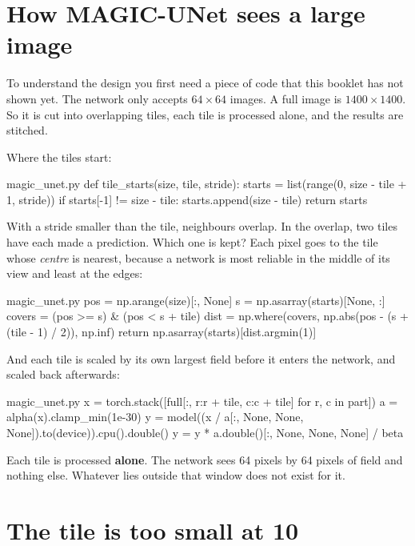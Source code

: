 \section{How MAGIC-UNet sees a large image}

To understand the design you first need a piece of code that this booklet has not shown yet. The network only accepts
$64\times64$ images. A full image is $1400\times1400$. So it is cut into overlapping tiles, each tile is processed
alone, and the results are stitched.

Where the tiles start:

\begin{code*}{magic_unet.py}
def tile_starts(size, tile, stride):
    starts = list(range(0, size - tile + 1, stride))
    if starts[-1] != size - tile:
        starts.append(size - tile)
    return starts
\end{code*}

With a stride smaller than the tile, neighbours overlap. In the overlap, two tiles have each made a prediction. Which
one is kept? Each pixel goes to the tile whose \emph{centre} is nearest, because a network is most reliable in the middle
of its view and least at the edges:

\begin{code*}{magic_unet.py}
    pos = np.arange(size)[:, None]
    s = np.asarray(starts)[None, :]
    covers = (pos >= s) & (pos < s + tile)
    dist = np.where(covers, np.abs(pos - (s + (tile - 1) / 2)), np.inf)
    return np.asarray(starts)[dist.argmin(1)]
\end{code*}

And each tile is scaled by its own largest field before it enters the network, and scaled back afterwards:

\begin{code*}{magic_unet.py}
        x = torch.stack([full[:, r:r + tile, c:c + tile] for r, c in part])
        a = alpha(x).clamp_min(1e-30)
        y = model((x / a[:, None, None, None]).to(device)).cpu().double()
        y = y * a.double()[:, None, None, None] / beta
\end{code*}

\begin{keyidea}
Each tile is processed \textbf{alone}. The network sees 64 pixels by 64 pixels of field and nothing else. Whatever lies
outside that window does not exist for it.
\end{keyidea}

\section{The tile is too small at 10\um}

